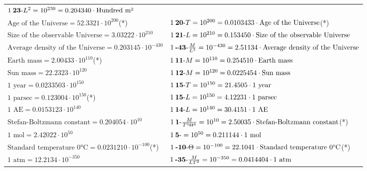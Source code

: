 \begin{center}
\begin{longtable}{l l}
	{\color{black}$1\:\text{\textbf{23}-} L^2=10^{230} = 0.204340 \cdot \textrm{Hundred m²}$}\\
{\color{black}$\textrm{Age of the Universe} = 52.3321\cdot10^{200} $}\quad(*)&
	{\color{black}$1\:\text{\textbf{20}-} T=10^{200} = 0.0103433 \cdot \textrm{Age of the Universe}$}\quad(*)\\
{\color{black}$\textrm{Size of the observable Universe} = 3.03222\cdot10^{210} $}&
	{\color{black}$1\:\text{\textbf{21}-} L=10^{210} = 0.153450 \cdot \textrm{Size of the observable Universe}$}\\
{\color{black}$\textrm{Average density of the Universe} = 0.203145\cdot10^{-430} $}&
	{\color{black}$1\:\text{\textbf{-43}-} \frac{M}{L^3}=10^{-430} = 2.51134 \cdot \textrm{Average density of the Universe}$}\\
{\color{black}$\textrm{Earth mass} = 2.00433\cdot10^{110} $}\quad(*)&
	{\color{black}$1\:\text{\textbf{11}-} M=10^{110} = 0.254510 \cdot \textrm{Earth mass}$}\\
{\color{black}$\textrm{Sun mass} = 22.2323\cdot10^{120} $}&
	{\color{black}$1\:\text{\textbf{12}-} M=10^{120} = 0.0225454 \cdot \textrm{Sun mass}$}\\
{\color{black}$\textrm{1 year} = 0.0233503\cdot10^{150} $}&
	{\color{black}$1\:\text{\textbf{15}-} T=10^{150} = 21.4505 \cdot \textrm{1 year}$}\\
{\color{black}$\textrm{1 parsec} = 0.123004\cdot10^{150} $}\quad(*)&
	{\color{black}$1\:\text{\textbf{15}-} L=10^{150} = 4.12231 \cdot \textrm{1 parsec}$}\\
{\color{black}$\textrm{1 AE} = 0.0153123\cdot10^{140} $}&
	{\color{black}$1\:\text{\textbf{14}-} L=10^{140} = 30.4151 \cdot \textrm{1 AE}$}\\
{\color{black}$\textrm{Stefan-Boltzmann constant} = 0.204054\cdot10^{10} $}&
	{\color{black}$1\:\text{\textbf{1}-} \frac{M}{T^3\Theta^4}=10^{10} = 2.50035 \cdot \textrm{Stefan-Boltzmann constant}$}\quad(*)\\
{\color{black}$\textrm{1 mol} = 2.42022\cdot10^{50} $}&
	{\color{black}$1\:\text{\textbf{5}-} =10^{50} = 0.211144 \cdot \textrm{1 mol}$}\\
{\color{black}$\textrm{Standard temperature 0°C} = 0.0231210\cdot10^{-100} $}\quad(*)&
	{\color{black}$1\:\text{\textbf{-10}-} \Theta=10^{-100} = 22.1041 \cdot \textrm{Standard temperature 0°C}$}\quad(*)\\
{\color{black}$\textrm{1 atm} = 12.2134\cdot10^{-350} $}&
	{\color{black}$1\:\text{\textbf{-35}-} \frac{M}{LT^2}=10^{-350} = 0.0414404 \cdot \textrm{1 atm}$}\\
\end{longtable}\end{center}
